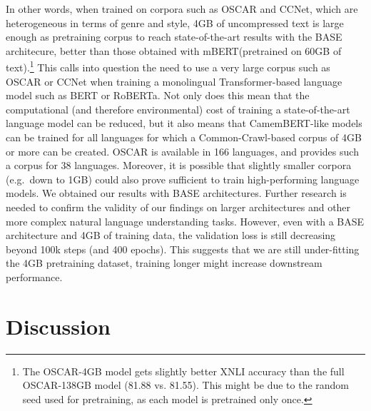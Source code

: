 \documentclass[11pt,a4paper]{article}
\newcommand{\camembert}{CamemBERT\xspace}
\newcommand{\roberta}{RoBERTa\xspace}
\newcommand{\mbert}{mBERT\xspace}
\newcommand{\ccnet}{CCNet\xspace}
\newcommand{\oscar}{OSCAR\xspace}
\begin{document}
In other words, when trained on corpora such as \oscar and \ccnet, which are heterogeneous in terms of genre and style, 4GB of uncompressed text is large enough as pretraining corpus to reach state-of-the-art results with the BASE architecure, better than those obtained with \mbert (pretrained on 60GB of text).\footnote{The OSCAR-4GB model gets slightly better XNLI accuracy than the full OSCAR-138GB model (81.88 vs. 81.55). This might be due to the random seed used for pretraining, as each model is pretrained only once.} This calls into question the need to use a very large corpus such as \oscar or \ccnet when training a monolingual Transformer-based language model such as BERT or \roberta.
Not only does this mean that the computational (and therefore environmental) cost of training a state-of-the-art language model can be reduced, but it also means that \camembert-like models can be trained for all languages for which a Common-Crawl-based corpus of 4GB or more can be created. \oscar is available in 166 languages, and provides such a corpus for 38 languages. Moreover, it is possible that slightly smaller corpora (e.g.~down to 1GB) could also prove sufficient to train high-performing language models.
We obtained our results with BASE architectures. Further research is needed to confirm the validity of our findings on larger architectures and other more complex natural language understanding tasks.
However, even with a BASE architecture and 4GB of training data, the validation loss is still decreasing beyond 100k steps (and 400 epochs). This suggests that we are still under-fitting the 4GB pretraining dataset, training longer might increase downstream performance.

\section{Discussion}
\end{document}
